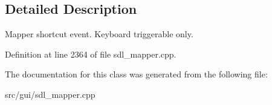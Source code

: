 \subsection{Detailed Description}
Mapper shortcut event. Keyboard triggerable only. 

Definition at line 2364 of file sdl\-\_\-mapper.\-cpp.



The documentation for this class was generated from the following file\-:\begin{DoxyCompactItemize}
\item 
src/gui/sdl\-\_\-mapper.\-cpp\end{DoxyCompactItemize}
